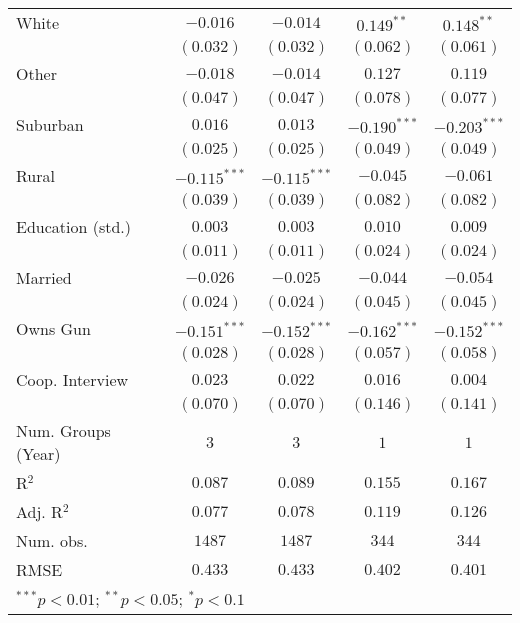 \begin{table}
\begin{center}
\begin{tabular}{l c c c c}
White                   & $-0.016$       & $-0.014$       & $0.149^{**}$   & $0.148^{**}$   \\
                        & $(0.032)$      & $(0.032)$      & $(0.062)$      & $(0.061)$      \\
Other                   & $-0.018$       & $-0.014$       & $0.127$        & $0.119$        \\
                        & $(0.047)$      & $(0.047)$      & $(0.078)$      & $(0.077)$      \\
Suburban                & $0.016$        & $0.013$        & $-0.190^{***}$ & $-0.203^{***}$ \\
                        & $(0.025)$      & $(0.025)$      & $(0.049)$      & $(0.049)$      \\
Rural                   & $-0.115^{***}$ & $-0.115^{***}$ & $-0.045$       & $-0.061$       \\
                        & $(0.039)$      & $(0.039)$      & $(0.082)$      & $(0.082)$      \\
Education (std.)        & $0.003$        & $0.003$        & $0.010$        & $0.009$        \\
                        & $(0.011)$      & $(0.011)$      & $(0.024)$      & $(0.024)$      \\
Married                 & $-0.026$       & $-0.025$       & $-0.044$       & $-0.054$       \\
                        & $(0.024)$      & $(0.024)$      & $(0.045)$      & $(0.045)$      \\
Owns Gun                & $-0.151^{***}$ & $-0.152^{***}$ & $-0.162^{***}$ & $-0.152^{***}$ \\
                        & $(0.028)$      & $(0.028)$      & $(0.057)$      & $(0.058)$      \\
Coop. Interview         & $0.023$        & $0.022$        & $0.016$        & $0.004$        \\
                        & $(0.070)$      & $(0.070)$      & $(0.146)$      & $(0.141)$      \\
\midrule
Num. Groups (Year)      & $3$            & $3$            & $1$            & $1$            \\
R$^2$                   & $0.087$        & $0.089$        & $0.155$        & $0.167$        \\
Adj. R$^2$              & $0.077$        & $0.078$        & $0.119$        & $0.126$        \\
Num. obs.               & $1487$         & $1487$         & $344$          & $344$          \\
RMSE                    & $0.433$        & $0.433$        & $0.402$        & $0.401$        \\
\bottomrule
\multicolumn{5}{l}{\scriptsize{$^{***}p<0.01$; $^{**}p<0.05$; $^{*}p<0.1$}}
\end{tabular}
\label{table_school_10+_fatalities}
\end{center}
\end{table}
